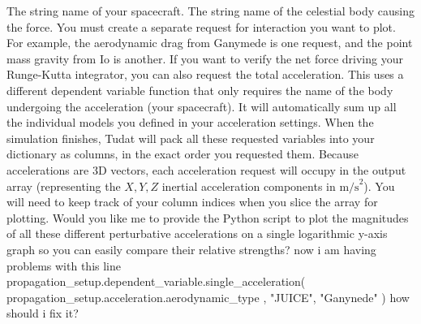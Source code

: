 \markdownRendererUlItem {} The string name of your spacecraft.\markdownRendererUlItemEnd 
\markdownRendererUlItem {} The string name of the celestial body causing the force.\markdownRendererUlItemEnd 
\markdownRendererUlEnd \markdownRendererInterblockSeparator
{}You must create a separate request for  interaction you want to plot. For example, the aerodynamic drag from Ganymede is one request, and the point mass gravity from Io is another.\markdownRendererInterblockSeparator
{}
\markdownRendererSectionEnd \markdownRendererSectionBegin
{}\markdownRendererInterblockSeparator
{}If you want to verify the net force driving your Runge-Kutta integrator, you can also request the total acceleration. This uses a different dependent variable function that only requires the name of the body undergoing the acceleration (your spacecraft). It will automatically sum up all the individual models you defined in your acceleration settings.\markdownRendererInterblockSeparator
{}
\markdownRendererSectionEnd \markdownRendererSectionBegin
{}\markdownRendererInterblockSeparator
{}When the simulation finishes, Tudat will pack all these requested variables into your  dictionary as columns, in the exact order you requested them.\markdownRendererInterblockSeparator
{}Because accelerations are 3D vectors, each acceleration request will occupy  in the output array (representing the $X, Y, Z$ inertial acceleration components in $\text{m/s}^2$). You will need to keep track of your column indices when you slice the array for plotting.\markdownRendererInterblockSeparator
{}\markdownRendererThematicBreak{}\markdownRendererInterblockSeparator
{}Would you like me to provide the Python script to plot the magnitudes of all these different perturbative accelerations on a single logarithmic y-axis graph so you can easily compare their relative strengths?\markdownRendererInterblockSeparator
{}\markdownRendererThematicBreak{}\markdownRendererInterblockSeparator
{}
\markdownRendererSectionEnd 
\markdownRendererSectionEnd \markdownRendererSectionBegin
{}\markdownRendererInterblockSeparator
{}now i am having problems with this line propagation_setup.dependent_variable.single_acceleration( propagation_setup.acceleration.aerodynamic_type , "JUICE", "Ganynede" ) how should i fix it?\markdownRendererInterblockSeparator
